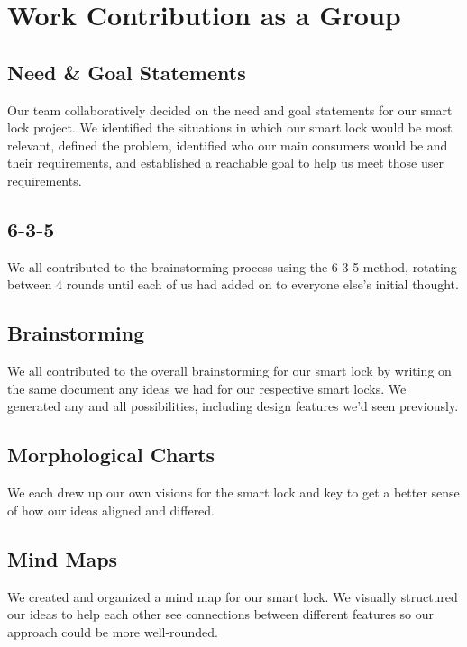 \section{Work Contribution as a Group}

\subsection*{Need & Goal Statements}
Our team collaboratively decided on the need and goal statements for our smart lock project. We identified the situations in which our smart lock would be most relevant, defined the problem, identified who our main consumers would be and their requirements, and established a reachable goal to help us meet those user requirements.

\subsection*{6-3-5}
We all contributed to the brainstorming process using the 6-3-5 method, rotating between 4 rounds until each of us had added on to everyone else's initial thought. 

\subsection*{Brainstorming}
We all contributed to the overall brainstorming for our smart lock by writing on the same document any ideas we had for our respective smart locks. We generated any and all possibilities, including design features we'd seen previously. 

\subsection*{Morphological Charts}
We each drew up our own visions for the smart lock and key to get a better sense of how our ideas aligned and differed.

\subsection*{Mind Maps}
We created and organized a mind map for our smart lock. We visually structured our ideas to help each other see connections between different features so our approach could be more well-rounded.